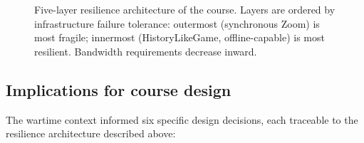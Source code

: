 \begin{figure}[!h]
\centering
\resizebox{0.85\textwidth}{!}{}
\caption{Five-layer resilience architecture of the course. Layers are ordered by infrastructure failure tolerance: outermost (synchronous Zoom) is most fragile; innermost (HistoryLikeGame, offline-capable) is most resilient. Bandwidth requirements decrease inward.}
\label{fig:resilience-architecture}
\end{figure}

\subsection{Implications for course design}

The wartime context informed six specific design decisions, each traceable to the resilience architecture described above:

